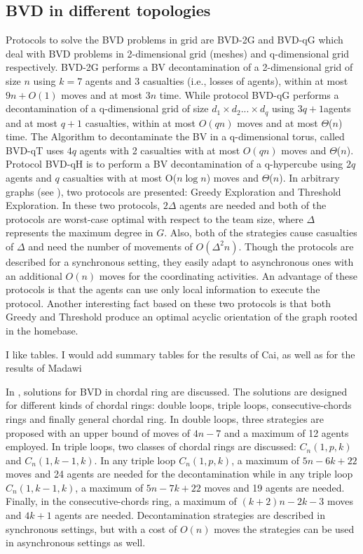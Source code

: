 \subsection{BVD in different topologies}
Protocols to solve the  BVD problems in grid are BVD-2G and BVD-qG which deal with BVD problems in 2-dimensional grid (meshes) and q-dimensional grid respectively. BVD-2G performs a BV decontamination of a 2-dimensional grid of size $n$ using $k=7$ agents and 3 casualties (i.e., losses of agents), within at most $9n+O(1)$ moves and at most $3n$ time. While protocol BVD-qG performs a decontamination of a q-dimensional grid of size $d_1\times d_2 ...\times d_q$ using $3q+1$agents and at most $q+1$ casualties, within at most $O(qn)$ moves and at most $\Theta$($n$) time. The Algorithm to decontaminate the BV in a q-dimensional torus, called BVD-qT uses $4q$ agents with 2 casualties with at most $O(qn)$ moves and $\Theta$($n$). Protocol BVD-qH is to perform a BV decontamination of a q-hypercube using $2q$ agents and $q$ casualties with at most O($n\log n$) moves and $\Theta$($n$). In arbitrary graphs (see \cite{cai1}), two protocols are presented: {\sc Greedy Exploration} and {\sc Threshold Exploration}. In these two protocols, $2\Delta$ agents are needed and both of the protocols are worst-case optimal with respect to the team size, where $\Delta$ represents the maximum degree in $G$. Also, both of the strategies cause casualties of $\Delta$ and need the number of movements of $O(\Delta ^{2}n)$. Though the protocols are described for a synchronous setting, they easily adapt to asynchronous ones with an additional $O(n)$ moves for the coordinating activities. An advantage of these protocols is that the agents can use only local information to execute the protocol. Another interesting fact based on these two protocols is that both {\sc Greedy} and {\sc Threshold}   produce an optimal acyclic orientation of the graph rooted in the homebase.

\color{blue}
I like tables. I would add summary tables for the results of Cai, as well as for the results of Madawi 
\color{black}

In \cite{alotaibi}, solutions for BVD in chordal ring are discussed. The solutions are designed for  different kinds of chordal rings: double loops, triple loops, consecutive-chords rings and finally general chordal ring. In double loops,     three strategies  are proposed  
with an  upper bound of moves of  $4n-7$  and a maximum of 12 agents   employed.
In triple loops,  two classes of chordal rings are discussed: $C_n(1,p,k)$  and $C_n(1,k-1,k)$. In any triple loop $C_n(1,p,k)$, a maximum of $5n-6k+22$ moves and 24 agents are needed for the decontamination while in any triple loop $C_n(1,k-1,k)$, a maximum of $5n-7k+22$ moves and 19 agents are needed. Finally, in the consecutive-chords ring, a maximum of $(k+2)n-2k-3$ moves and $4k+1$ agents are needed. Decontamination strategies  are described  in synchronous settings, but   with a cost of $O(n)$ moves   the strategies can be used in asynchronous settings as well.







 









